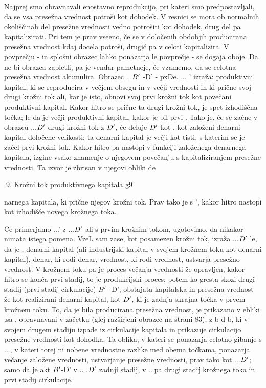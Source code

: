 \documentclass[kapital_02.tex]{subfiles}
\begin{document}
Najprej smo obravnavali enostavno reprodukcijo, pri kateri smo predpostavljali, da se vsa presežna vrednost potroši kot dohodek. V resnici se mora ob normalnih okoliščinah del presežne vrednosti vedno potrošiti kot dohodek, drug del pa kapitalizirati. Pri tem je prav vseeno, če se v določenih obdobjih producirana presežna vrednost kdaj docela potroši, drugič pa v celoti kapitalizira. V povprečju - in splošni obrazec lahko ponazarja le povprečje - se dogaja oboje. Da ne bi obrazca zapletli, pa je vendar pametneje, če vzamemo, da se celotna presežna vrednost akumulira. Obrazec \KPEP...\( B' \) -D' - pxDe. ... \KPEP' izraža: produktivni kapital, ki se reproducira v večjem obsegu in v večji vrednosti in ki prične svoj drugi krožni tok ali, kar je isto, obnovi svoj prvi krožni tok kot povečani produktivni kapital. Kakor hitro se prične ta drugi krožni tok, je \KPEP spet izhodiščna točka; le da je \KPEP večji produktivni kapital, kakor je bil prvi \KPEP. Tako je, če se začne v obrazcu \KPED...\( D' \) drugi krožni tok z \( D' \), če deluje \( D' \) kot \KPED, kot založeni denarni kapital določene velikosti; ta denarni kapital je večji kot tisti, s katerim se je začel prvi krožni tok. Kakor hitro pa nastopi v funkciji založenega denarnega kapitala, izgine vsako znamenje o njegovem povečanju s kapitaliziranjem presežne vrednosti. Ta izvor je zbrisan v njegovi obliki de

 9. Krožni tok produktivnega kapitala g9



 narnega kapitala, ki prične njegov krožni tok. Prav tako je s \KPEP', kakor hitro nastopi kot izhodišče novega krožnega toka.

Če primerjamo \KPEP...\KPEP' z \KPED...\( D' \) ali s prvim krožnim tokom, ugotovimo, da nikakor nimata istega pomena. VzeL sam zase, kot posamezen krožni tok, izraža \KPED...\( D' \) le, da je \KPED, denarni kapital (ali industrijski kapital v svojem krožnem toku kot denarni kapital), denar, ki rodi denar, vrednost, ki rodi vrednost, ustvarja presežno vrednost. V krožnem toku \KPEP pa je proces večanja vrednosti že opravljen, kakor hitro se konča prvi stadij, to je produkcijski proces; potem ko gresta skozi drugi stadij (prvi stadij cirkulacije) \( B' \) -D', obstajata kapitalska in presežna vrednost že kot realizirani denarni kapital, kot \( D' \), ki je zadnja skrajna točka v prvem krožnem toku. To, da je bila producirana presežna vrednost, je prikazano v ebliki \KPEP.sa-\KPEP, obravnavani v začetku (glej razširjeni obrazec na strani 83), z b-d-b, ki v svojem drugem stadiju izpade iz cirkulacije kapitala in prikazuje cirkulacijo presežne vrednosti kot dohodka. Ta oblika, v kateri se ponazarja celotno gibanje s \KPEP...\KPEP, v kateri torej ni nobene vrednostne razlike med obema točkama, ponazarja večanje založene vrednosti, ustvarjanje presežne vrednosti, prav tako kot \KPED...\( D' \); samo da je akt \( B' \)-D' v \KPED.. .\( D' \) zadnji stadij, v \KPEP...\KPEP pa drugi stadij krožnega toka in prvi stadij cirkulacije.
\end{document}
